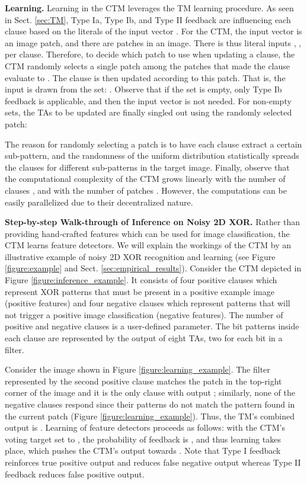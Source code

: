 \documentclass{article}
\begin{document}
\textbf{Learning.} Learning in the CTM leverages the TM learning procedure. As seen in Sect. \ref{sec:TM}, Type Ia, Type Ib, and Type II feedback are influencing each clause  based on the literals of the input vector . For the CTM, the input vector is an image patch, and there are  patches in an image. There is thus  literal inputs , , per clause. Therefore, to decide which patch to use when updating a clause, the CTM randomly  selects a single patch among the patches that made the clause evaluate to . The clause is then updated according to this patch. That is, the input  is drawn from the set: . Observe that if the set is empty, only Type Ib feedback is applicable, and then the input vector is not needed. For non-empty sets, the TAs to be updated are finally singled out using the randomly selected patch:

The reason for randomly selecting a patch is to have each clause extract a certain sub-pattern, and the randomness of the uniform distribution statistically spreads the clauses for different sub-patterns in the target image.  Finally, observe that the computational complexity of the CTM grows linearly with the number of clauses , and with the number of patches . However, the computations can be easily parallelized due to their decentralized nature.

\textbf{Step-by-step Walk-through of Inference on Noisy 2D XOR.} Rather than providing hand-crafted features which can be used for image classification, the CTM learns feature detectors. We will explain the workings of the CTM by an illustrative example of noisy 2D XOR recognition and learning (see Figure \ref{figure:example} and Sect. \ref{sec:empirical_results}). Consider the CTM depicted in Figure \ref{figure:inference_example}. It consists of four positive clauses which represent XOR patterns that must be present in a positive example image (positive features) and four negative clauses which represent patterns that will not trigger a positive image classification (negative features). The number of positive and negative clauses is a user-defined parameter. The bit patterns inside each clause are represented by the output of eight TAs, two for each bit in a  filter.

Consider the  image shown in Figure \ref{figure:learning_example}. The filter represented by the second positive clause matches the patch in the top-right corner of the image and it is the only clause with output ; similarly, none of the negative clauses respond since their patterns do not match the pattern found in the current patch (Figure \ref{figure:learning_example}). Thus, the TM's combined output is . Learning of feature detectors proceeds as follows: with the CTM’s voting target set to , the probability of feedback is , and thus learning takes place, which pushes the CTM’s output  towards . Note that Type I feedback reinforces true positive output and reduces false negative output whereas Type II feedback reduces false positive output.
\end{document}
